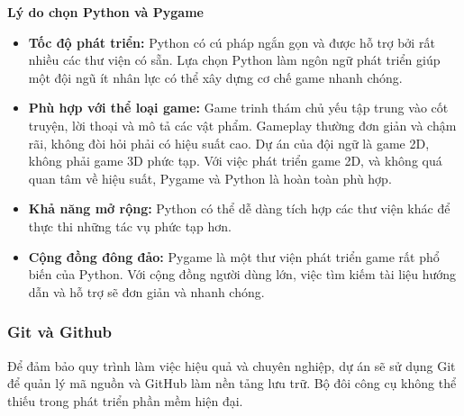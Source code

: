 \textbf{Lý do chọn Python và Pygame}
\begin{itemize}
    \item \textbf{Tốc độ phát triển:}
    Python có cú pháp ngắn gọn và được hỗ trợ bởi rất nhiều các thư viện có sẵn. Lựa chọn Python làm ngôn ngữ phát triển giúp một đội ngũ ít nhân lực có thể xây dựng cơ chế game nhanh chóng.

    \item \textbf{Phù hợp với thể loại game:}
    Game trinh thám chủ yếu tập trung vào cốt truyện, lời thoại và mô tả các vật phẩm. Gameplay thường đơn giản và chậm rãi, không đòi hỏi phải có hiệu suất cao. Dự án của đội ngữ là game 2D, không phải game 3D phức tạp. Với việc phát triển game 2D, và không quá quan tâm về hiệu suất, Pygame và Python là hoàn toàn phù hợp.

    \item \textbf{Khả năng mở rộng:}
    Python có thể dễ dàng tích hợp các thư viện khác để thực thi những tác vụ phức tạp hơn.

    \item \textbf{Cộng đồng đông đảo:}
    Pygame là một thư viện phát triển game rất phổ biến của Python. Với cộng đồng người dùng lớn, việc tìm kiếm tài liệu hướng dẫn và hỗ trợ sẽ đơn giản và nhanh chóng.
\end{itemize}

\subsubsection{Git và Github}
Để đảm bảo quy trình làm việc hiệu quả và chuyên nghiệp, dự án sẽ sử dụng Git để quản lý mã nguồn và GitHub làm nền tảng lưu trữ. Bộ đôi công cụ không thể thiếu trong phát triển phần mềm hiện đại.

